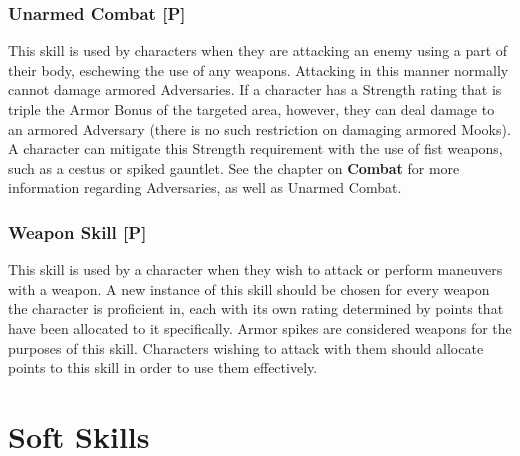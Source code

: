 \documentclass[oneside]{book}
\newcommand{\comment}[1]{}
\begin{document}
\begin{multicols}{2}
\comment{\subsubsection{Tactics [M]}
This skill is for characters who wish to direct their ally's actions on the battlefield, informing them how best to defeat their enemies in any situation. Whenever three or more allies are in combat with a specific enemy, a character may use their combat turn to make a check against their Tactics skill. Based on their level of success, each ally in combat with that specific enemy at the time of this check receive a bonus on their next turn on any resolution checks involving combat with that enemy. This bonus is lost at the end of the next turn, and bonuses from multiple Tactics checks do not stack. The magnitude of this bonus ranges from +1 to +4, for Green through Black successes respectively. 
}

\subsubsection{Unarmed Combat [P]}
This skill is used by characters when they are attacking an enemy using a part of their body, eschewing the use of any weapons. Attacking in this manner normally cannot damage armored Adversaries. If a character has a Strength rating that is triple the Armor Bonus of the targeted area, however, they can deal damage to an armored Adversary (there is no such restriction on damaging armored Mooks). A character can mitigate this Strength requirement with the use of fist weapons, such as a cestus or spiked gauntlet. See the chapter on \textbf{Combat} for more information regarding Adversaries, as well as Unarmed Combat. 

\subsubsection{Weapon Skill [P]}
This skill is used by a character when they wish to attack or perform maneuvers with a weapon. A new instance of this skill should be chosen for every weapon the character is proficient in, each with its own rating determined by points that have been allocated to it specifically. Armor spikes are considered weapons for the purposes of this skill. Characters wishing to attack with them should allocate points to this skill in order to use them effectively.

\section{Soft Skills}


\end{multicols}
\end{document}
